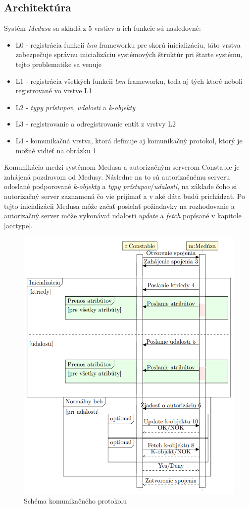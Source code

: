 \subsection{Architektúra}
Systém \textit{Medusa} sa skladá z 5 vrstiev a ich funkcie sú nasledovné:
\begin{itemize}
\item L0 - registrácia funkcii \textit{lsm} frameworku pre skorú inicializáciu, táto vrstva zabezpečuje správnu inicializáciu systémových štruktúr pri štarte systému, tejto problematike sa venuje \cite{medusatim}
\item L1 - registrácia všetkých funkcii \textit{lsm} frameworku, teda aj tých ktoré neboli registrované vo vrstve L1
\item L2 - \textit{typy prístupov}, \textit{udalosti} a \textit{k-objekty}
\item L3 - registrovanie a odregistrovanie entít z vrstvy L2
\item L4 - komunikačná vrstva, ktorá definuje aj komunikačný protokol, ktorý je možné vidieť na obrázku \ref{medusakomunikacia}
\end{itemize}
Komunikácia medzi systémom Medusa a autorizačným serverom Constable je zahájená pozdravom od Medusy. Následne na to sú autorizačnému serveru odoslané podporované \textit{k-objekty} a \textit{typy prístupov}/\textit{udalostí}, na základe čoho si autorizačný server zaznamená čo vie prijímať a v aké dáta budú prichádzať. Po tejto inicializácii Medusa môže začať posielať požiadavky na rozhodovanie a autorizačný server môže vykonávať udalosti \textit{update} a \textit{fetch} popísané v kapitole \ref{acctype}.
\begin{figure}[!htbp]
  \centering
  \includegraphics[width=12cm]{img/komunikacia.png}
  \caption{Schéma komunikačného protokolu\cite{kacer}}
  \label{medusakomunikacia}
\end{figure}

